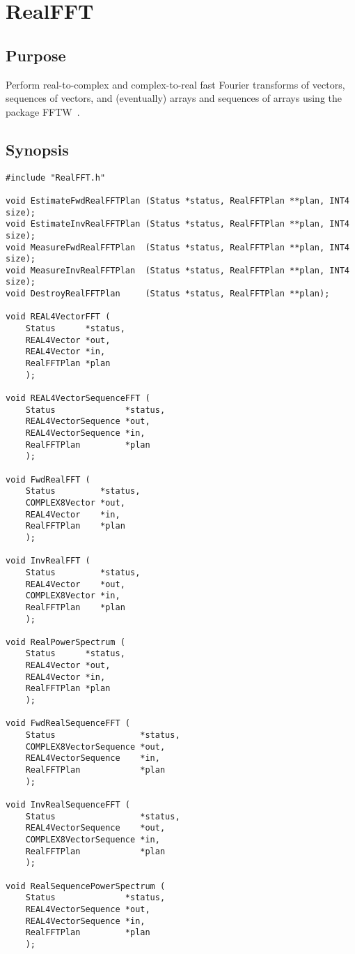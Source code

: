 \documentclass{article}
\begin{document}
\section{RealFFT}

\subsection{Purpose}

Perform real-to-complex and complex-to-real fast Fourier transforms of
vectors, sequences of vectors, and (eventually) arrays and sequences of
arrays using the package FFTW~\cite{fj:1998}.

\subsection{Synopsis}


\begin{verbatim}
#include "RealFFT.h"

void EstimateFwdRealFFTPlan (Status *status, RealFFTPlan **plan, INT4 size);
void EstimateInvRealFFTPlan (Status *status, RealFFTPlan **plan, INT4 size);
void MeasureFwdRealFFTPlan  (Status *status, RealFFTPlan **plan, INT4 size);
void MeasureInvRealFFTPlan  (Status *status, RealFFTPlan **plan, INT4 size);
void DestroyRealFFTPlan     (Status *status, RealFFTPlan **plan);

void REAL4VectorFFT (
    Status      *status,
    REAL4Vector *out,
    REAL4Vector *in,
    RealFFTPlan *plan
    );

void REAL4VectorSequenceFFT (
    Status              *status,
    REAL4VectorSequence *out,
    REAL4VectorSequence *in,
    RealFFTPlan         *plan
    );

void FwdRealFFT (
    Status         *status,
    COMPLEX8Vector *out,
    REAL4Vector    *in,
    RealFFTPlan    *plan
    );

void InvRealFFT (
    Status         *status,
    REAL4Vector    *out,
    COMPLEX8Vector *in,
    RealFFTPlan    *plan
    );

void RealPowerSpectrum (
    Status      *status,
    REAL4Vector *out,
    REAL4Vector *in,
    RealFFTPlan *plan
    );

void FwdRealSequenceFFT (
    Status                 *status,
    COMPLEX8VectorSequence *out,
    REAL4VectorSequence    *in,
    RealFFTPlan            *plan
    );

void InvRealSequenceFFT (
    Status                 *status,
    REAL4VectorSequence    *out,
    COMPLEX8VectorSequence *in,
    RealFFTPlan            *plan
    );

void RealSequencePowerSpectrum (
    Status              *status,
    REAL4VectorSequence *out,
    REAL4VectorSequence *in,
    RealFFTPlan         *plan
    );
\end{verbatim}
\end{document}
